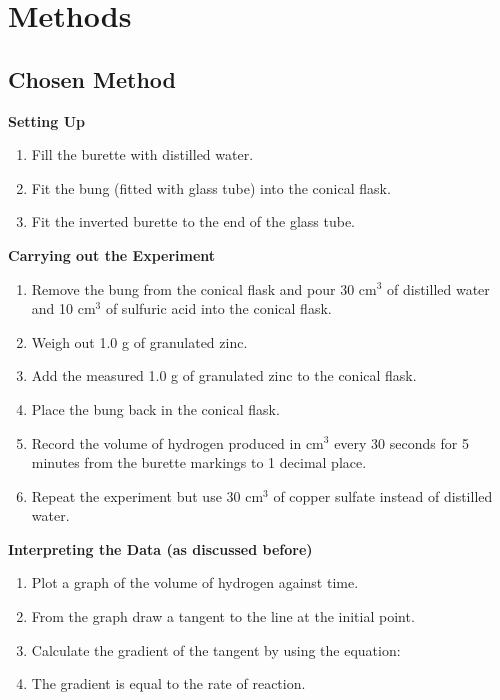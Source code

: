 \section{Methods}

	\subsection{Chosen Method}

\textbf{Setting Up}

\begin{enumerate}
\item Fill the burette with distilled water.
\item Fit the bung (fitted with glass tube) into the conical flask.
\item Fit the inverted burette to the end of the glass tube.
\end{enumerate}

\textbf{Carrying out the Experiment}

\begin{enumerate}
\item Remove the bung from the conical flask and pour 30 cm$^3$ of distilled water and 10 cm$^3$ of sulfuric acid into the conical flask.
\item Weigh out 1.0 g of granulated zinc.
\item Add the measured 1.0 g of granulated zinc to the conical flask.
\item Place the bung back in the conical flask.
\item Record the volume of hydrogen produced in cm$^3$ every 30 seconds for 5 minutes from the burette markings to 1 decimal place.
\item Repeat the experiment but use 30 cm$^3$ of copper sulfate instead of distilled water.
\end{enumerate} 

\textbf{Interpreting the Data (as discussed before)}

\begin{enumerate}
\item Plot a graph of the volume of hydrogen against time.
\item From the graph draw a tangent to the line at the initial point.
\item Calculate the gradient of the tangent by using the equation: 
\item The gradient is equal to the rate of reaction.
\end{enumerate}







